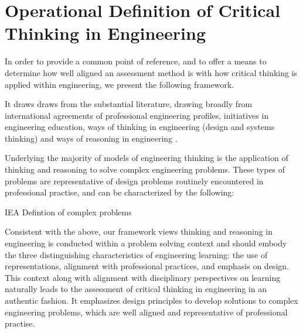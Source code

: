\section{Operational Definition of Critical Thinking in Engineering}

In order to provide a common point of reference, and to offer a means to determine how well aligned an assessment method is with how critical thinking is applied within engineering, we present the following framework.  

It draws draws from the substantial literature, drawing broadly from international agreements of professional engineering profiles\cite{internationalengineeringalliance}, initiatives in engineering education\cite{crawley2011cdio}, ways of thinking in engineering (design and systems thinking) \cite{Dorst:2010tc, Dym:2005gy, Frank:2001ut}and ways of reasoning in engineering \cite{Stein:2011hr, Paul:2006kv}. 

Underlying the majority of models of engineering thinking is the application of thinking and reasoning to solve complex engineering problems. These types of problems are representative of design problems routinely encountered in professional practise, and can be characterized by the following: 

{IEA Defintion of complex problems}

Consistent with the above, our framework views thinking and reasoning in engineering is conducted within a problem solving context and should embody the three distinguishing characteristics of engineering learning: the use of representations, alignment with professional practices, and emphasis on design\cite{Johri:2014tk}. This context along with alignment with disciplinary perspectives on learning naturally leads to the assessment of critical thinking in engineering in an authentic fashion.  It emphasizes design principles to develop solutions to  complex engineering problems, which are well aligned and representative of professional practise.

